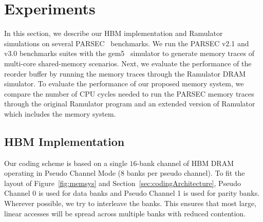   \section{Experiments}
\label{sec:experiments}

In this section, we describe our HBM implementation and Ramulator~\cite{Ramulator} simulations on several PARSEC~\cite{bienia09parsec2} benchmarks. We run the PARSEC v2.1 and v3.0 benchmarks suites with the gem5~\cite{parsec_2_1_m5} simulator to generate memory traces of multi-core shared-memory scenarios. Next, we evaluate the performance of the reorder buffer by running the memory traces through the Ramulator DRAM simulator. To evaluate the performance of our proposed memory system, we compare the number of CPU cycles needed to run the PARSEC memory traces through the original Ramulator program and an extended version of Ramulator which includes the memory system.

\subsection{HBM Implementation}
Our coding scheme is based on a single $16$-bank channel of HBM DRAM operating in Pseudo Channel Mode ($8$ banks per pseudo channel). To fit the layout of Figure~\ref{fig:memsys} and Section~\ref{sec:codingArchitecture}, Pseudo Channel 0 is used for data banks and Pseudo Channel 1 is used for parity banks. 
%
%
Wherever possible, we try to interleave the banks. This ensures that most large, linear accesses will be spread across multiple banks with reduced contention.

